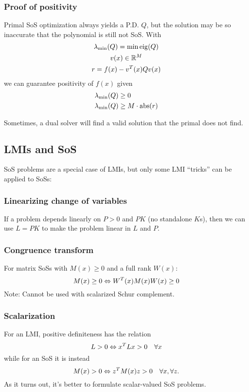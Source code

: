 \subsubsection{Proof of positivity}
Primal SoS optimization always yields a P.D. $Q$, but the solution may be so inaccurate that the polynomial is still not SoS. With
%
\begin{gather}
    \lambda_{\min}(Q) = \min \operatorname{eig}(Q) \\
    v(x) \in \mathbb{R}^M \\
    r = f(x) - v^{T}(x) Q v(x)
\end{gather}
%
we can guarantee positivity of $f(x)$ given
%
\begin{equation}
  \begin{split}
    \lambda_{\min}(Q) &\geq 0 \\
    \lambda_{\min}(Q) &\geq M \cdot \operatorname{abs}(r)
  \end{split}
\end{equation}

Sometimes, a dual solver will find a valid solution that the primal does not find.

\subsection{LMIs and SoS}
SoS problems are a special case of LMIs, but only some LMI ``tricks'' can be applied to SoSs:

\subsubsection{Linearizing change of variables}
If a problem depends linearly on $P>0$ and $PK$ (no standalone $K$s), then we can use $L = PK$ to make the problem linear in $L$ and $P$.

\subsubsection{Congruence transform}
For matrix SoSs with $M(x) \geq 0$ and a full rank $W(x)$:
\begin{equation}
  M(x) \geq 0 \Leftrightarrow W^{T}(x) M(x) W(x) \geq 0
\end{equation}
Note: Cannot be used with scalarized Schur complement.

\subsubsection{Scalarization}
For an LMI, positive definiteness has the relation
%
\begin{equation}
  L > 0 \Leftrightarrow x^{T} L x > 0 \quad \forall x
\end{equation}
%
while for an SoS it is instead
%
\begin{equation}
  M(x) > 0 \Leftrightarrow z^{T} M(x) z > 0 \quad \forall x, \forall z.
\end{equation}
%
As it turns out, it's better to formulate scalar-valued SoS problems.

